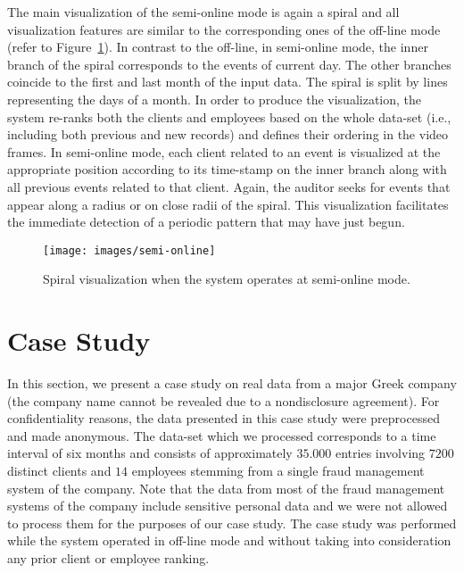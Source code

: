 \documentclass[conference]{IEEEtran}
\begin{document}
The main visualization of the semi-online mode is again a spiral and
all visualization features are similar to the corresponding ones of
the off-line mode (refer to Figure~\ref{fig:semi-online}). In
contrast to the off-line, in semi-online mode, the inner branch of
the spiral corresponds to the events of current day. The other
branches coincide to the first and last month of the input data. The
spiral is split by lines representing the days of a month. In order
to produce the visualization, the system re-ranks both the clients
and employees based on the whole data-set (i.e., including both
previous and new records) and defines their ordering in the video
frames. In semi-online mode, each client related to an event is
visualized at the appropriate position according to its time-stamp
on the inner branch along with all previous events related to that
client. Again, the auditor seeks for events that appear along a
radius or on close radii of the spiral. This visualization
facilitates the immediate detection of a periodic pattern that may
have just begun.

\begin{figure}[h!tb]
  \centering
  \texttt{[image: images/semi-online]}
  \caption{Spiral visualization when the system operates at semi-online mode.}
  \label{fig:semi-online}
\end{figure}

\section{Case Study}
\label{sec:case-study}

In this section, we present a case study on real data from a major
Greek company (the company name cannot be revealed due to a
nondisclosure agreement). For confidentiality reasons, the data
presented in this case study were preprocessed and made anonymous.
The data-set which we processed corresponds to a time interval of
six months and consists of approximately $35.000$ entries involving
$7200$ distinct clients and $14$ employees stemming from a single
fraud management system of the company. Note that the data from most
of the fraud management systems of the company include sensitive
personal data and we were not allowed to process them for the
purposes of our case study. The case study was performed while the
system operated in off-line mode and without taking into
consideration any prior client or employee ranking.
\end{document}
